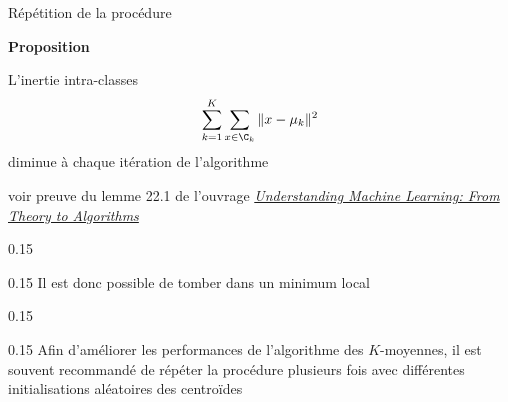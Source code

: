 \documentclass[10pt]{beamer}
\begin{document}
\begin{frame}{Répétition de la procédure}


		\textcolor{MPTred}{\large\textbf{Proposition}} \\ 
	\vspace*{-0.2em}		
	\begin{valblock}{}
		L’inertie intra-classes 
		$$\displaystyle\sum_{k=1}^K  \sum_{x \in \C_k} \|x-\mu_k\|^2$$
		diminue à chaque itération de l’algorithme
	\end{valblock}	
\footnotesize{\textcolor{MPTgrey}{voir preuve du lemme 22.1 de l'ouvrage \textit{\href{https://www.cs.huji.ac.il/~shais/UnderstandingMachineLearning/understanding-machine-learning-theory-algorithms.pdf}{Understanding Machine Learning: From Theory to Algorithms}}} }
\normalsize
	\vspace*{1em}
\begin{minipc}[0.1]{0.15}
	\warning
\end{minipc}
\begin{minipc}[0.89]{0.15}
	Il est donc possible de tomber dans un minimum local 
\end{minipc}
\begin{minipc}[0.1]{0.15}
	\raisebox{1.5mm}{\bclampe \xspace} 
\end{minipc}
\begin{minipc}[0.89]{0.15}
	Afin d'améliorer les performances de l'algorithme des $K$-moyennes, il est souvent recommandé de répéter la procédure plusieurs fois avec différentes initialisations aléatoires des centroïdes
\end{minipc}
	
\end{frame}
\end{document}
